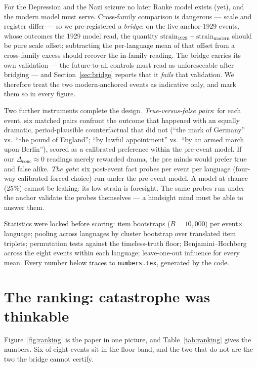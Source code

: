 \documentclass[11pt]{article}
\begin{document}
For the Depression and the Nazi seizure no later Ranke model exists (yet), and the modern model must serve.
Cross-family comparison is dangerous --- scale and register differ --- so we pre-registered a \emph{bridge}:
on the five anchor-1929 events, whose outcomes the 1929 model read, the quantity
$\mathrm{strain}_{1929}-\mathrm{strain}_{\text{modern}}$ should be pure scale offset; subtracting the
per-language mean of that offset from a cross-family excess should recover the in-family reading. The
bridge carries its own validation --- the future-to-all controls must read as unforeseeable after
bridging --- and Section~\ref{sec:bridge} reports that it \emph{fails} that validation. We therefore treat
the two modern-anchored events as indicative only, and mark them so in every figure.

Two further instruments complete the design. \emph{True-versus-false pairs}: for each event, six matched
pairs confront the outcome that happened with an equally dramatic, period-plausible counterfactual that
did not (``the mark of Germany'' vs.\ ``the pound of England''; ``by lawful appointment'' vs.\ ``by an
armed march upon Berlin''), scored as a calibrated preference within the pre-event model. If our
$\Delta_{\text{conc}}\approx 0$ readings merely rewarded drama, the pre minds would prefer true and false
alike. \emph{The gate}: six post-event fact probes per event per language (four-way calibrated forced
choice) run under the pre-event model. A model at chance (25\%) cannot be leaking: its low strain is
foresight. The same probes run under the anchor validate the probes themselves --- a hindsight mind must be
able to answer them.

Statistics were locked before scoring: item bootstraps ($B=10{,}000$) per event$\times$language; pooling
across languages by cluster bootstrap over translated item triplets; permutation tests against the
timeless-truth floor; Benjamini--Hochberg across the eight events within each language; leave-one-out
influence for every mean. Every number below traces to \texttt{numbers.tex}, generated by the code.

\section{The ranking: catastrophe was thinkable}\label{sec:ranking}

Figure~\ref{fig:ranking} is the paper in one picture, and Table~\ref{tab:ranking} gives the numbers. Six
of eight events sit in the floor band, and the two that do not are the two the bridge cannot certify.
\end{document}
